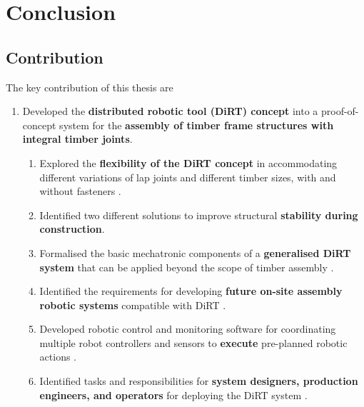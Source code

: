 \chapter{Conclusion}
\label{chapter:conclusion}

\section{Contribution}
\label{section:contribution}

The key contribution of this thesis are

\begin{enumerate}
	\item Developed the \textbf{distributed robotic tool (DiRT) concept} into a proof-of-concept system for the \textbf{assembly of timber frame structures with integral timber joints}. 
	\begin{enumerate}
		\item Explored the \textbf{flexibility of the DiRT concept} in accommodating different variations of lap joints and different timber sizes, with and without fasteners .

		\item Identified two different solutions to improve structural \textbf{stability during construction}. 

		\item Formalised the basic mechatronic components of a \textbf{generalised DiRT system} that can be applied beyond the scope of timber assembly .

		\item Identified the requirements for developing \textbf{future on-site assembly robotic systems} compatible with DiRT .

		\item Developed robotic control and monitoring software for coordinating multiple robot controllers and sensors to \textbf{execute} pre-planned robotic actions .

		\item Identified tasks and responsibilities for\textbf{ system designers, production engineers, and operators} for deploying the DiRT system .


\end{enumerate}
\end{enumerate}
